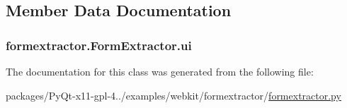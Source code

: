 \subsection{Member Data Documentation}
\hypertarget{classformextractor_1_1FormExtractor_a8fc01b9052abaffcd10387f7870421aa}{}
\subsubsection[{ui}]{\setlength{\rightskip}{0pt plus 5cm}formextractor.\+Form\+Extractor.\+ui}\label{classformextractor_1_1FormExtractor_a8fc01b9052abaffcd10387f7870421aa}


The documentation for this class was generated from the following file\+:\begin{DoxyCompactItemize}
\item 
packages/\+Py\+Qt-\/x11-\/gpl-\/4../examples/webkit/formextractor/\hyperlink{formextractor_8py}{formextractor.\+py}\end{DoxyCompactItemize}
